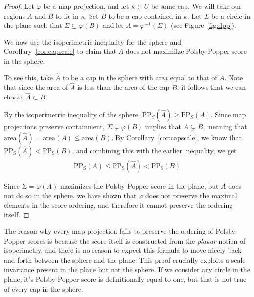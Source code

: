 \begin{proof}
  Let $\varphi$ be a map projection, and let 
  $\kappa \subset U$ be some cap. We will take our regions 
  $A$ and $B$ to lie in $\kappa$. Set $B$ to be a cap 
  contained in $\kappa$. Let $\Sigma$ be a circle in 
  the plane such that $\Sigma
  \subsetneq \varphi(B)$ and let $A=\varphi^{-1}(\Sigma)$ (see
  Figure~\ref{fig:dpp}).

  We now use the isoperimetric inequality for the sphere 
  and Corollary~\ref{cor:capscale} to claim that 
  $A$ does not maximilze Polsby-Popper score in the sphere.

  To see this, take $\hat{A}$ to be a cap in the sphere with 
  area equal to that of $A$. Note that since the 
  area of $\hat {A}$ is less than the area of the cap $B$, it 
  follows that we can choose $\hat{A}\subset B$. 
  
  By the isoperimetric inequality of the sphere, 
  $\mathrm{PP}_S(\hat{A})\geq
  \mathrm{PP}_S(A)$. Since map projections preserve containment,
  $\Sigma\subsetneq \varphi(B)$ implies that $A\subsetneq B$, 
  meaning that $\mathrm{area}(\hat A) = \mathrm{area}(A)\lneq 
  \mathrm{area}(B)$. By Corollary~\ref{cor:capscale}, we know that
  $\mathrm{PP_S}(\hat{A})< \mathrm{PP_S}(B)$, and combining this with
  the earlier inequality, we get
  \begin{align*}
    \mathrm{PP_S}({A})\leq \mathrm{PP_S}(\hat{A})< \mathrm{PP_S}(B)
  \end{align*}

  Since $\Sigma = \varphi(A)$ maximizes the Polsby-Popper score in the
  plane, but $A$ does not do so in the sphere, we have shown that
  $\varphi$ does not preserve the maximal elements in the score
  ordering, and therefore it cannot preserve the ordering itself.
\end{proof}

The reason why every map projection fails to preserve the ordering of
Polsby-Popper scores is because the score itself is constructed from
the \textit{planar} notion of isoperimetry, and there is no reason to
expect this formula to move nicely back and forth between the sphere
and the plane.  This proof crucially exploits a scale invariance
present in the plane but not the sphere.  If we consider any circle in
the plane, it's Polsby-Popper score is definitionally equal to one,
but that is not true of every cap in the sphere.  
